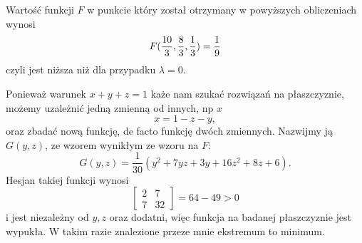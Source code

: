 \documentclass{article}[13pt]
\begin{document}
    Wartość funkcji $F$ w punkcie który został otrzymany w powyższych obliczeniach wynosi
    $$F({10\over3},\frac83,\frac13)=\frac19$$
    czyli jest niższa niż dla przypadku $\lambda=0$.
    \medskip
    

    Ponieważ warunek $x+y+z=1$ każe nam szukać rozwiązań na płaszczyznie, możemy uzależnić jedną zmienną od innych, np $x$ 
    $$x=1-z-y,$$
    oraz zbadać nową funkcję, de facto funkcję dwóch zmiennych. Nazwijmy ją $G(y,z)$, ze wzorem wynikłym ze wzoru na $F$:
    $$G(y,z)=\frac1{30}(y^2+7yz+3y+16z^2+8z+6).$$
    Hesjan takiej funkcji wynosi
    $$
        \begin{bmatrix}
            2 & 7\\
            7 & 32
        \end{bmatrix}=64-49>0
    $$
    i jest niezależny od $y,z$ oraz dodatni, więc funkcja na badanej płaszczyznie jest wypukła. W takim razie znalezione przeze mnie ekstremum to minimum.
\end{document}

